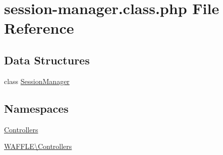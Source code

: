 \hypertarget{session-manager_8class_8php}{}\section{session-\/manager.class.\+php File Reference}
\label{session-manager_8class_8php}
\subsection*{Data Structures}
\begin{DoxyCompactItemize}
\item 
class \hyperlink{class_w_a_f_f_l_e_1_1_controllers_1_1_session_manager}{Session\+Manager}
\end{DoxyCompactItemize}
\subsection*{Namespaces}
\begin{DoxyCompactItemize}
\item 
 \hyperlink{namespace_controllers}{Controllers}
\item 
 \hyperlink{namespace_w_a_f_f_l_e_1_1_controllers}{W\+A\+F\+F\+L\+E\textbackslash{}\+Controllers}
\end{DoxyCompactItemize}
